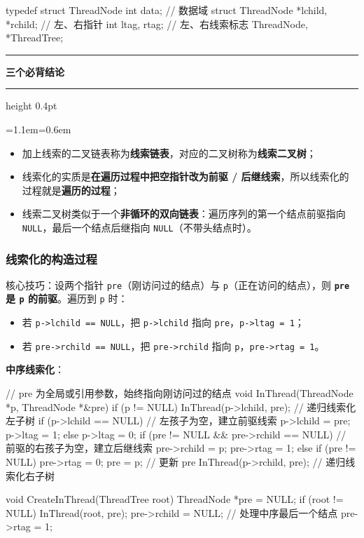 \documentclass[11pt,openany,UTF8]{ctexbook}
\newcommand{\callouthead}[2]{%
  \par\addvspace{7pt}\noindent
  {\color{#1}\rule[-0.15em]{3pt}{1.05em}}\hspace{0.5em}%
  {\bfseries\color{#1}#2}\par\nobreak\vspace{-0.35em}%
  {\color{rulesep}\hrule height 0.4pt}\nobreak\vspace{0.45em}%
  \begingroup\small\setlength{\parindent}{0pt}%
  \leftskip=1.1em\rightskip=0.6em\noindent\ignorespaces}
\newcommand{\calloutend}{\par\endgroup\addvspace{7pt}}
\newenvironment{callkey}[1]{\callouthead{keybar}{#1}}{\calloutend}
\begin{document}
\begin{codebox}
typedef struct ThreadNode {
    int data;                            // 数据域
    struct ThreadNode *lchild, *rchild;  // 左、右指针
    int ltag, rtag;                      // 左、右线索标志
} ThreadNode, *ThreadTree;
\end{codebox}

\begin{callkey}{三个必背结论}
\begin{itemize}
\item 加上线索的二叉链表称为\textbf{线索链表}，对应的二叉树称为\textbf{线索二叉树}；
\item 线索化的实质是\textbf{在遍历过程中把空指针改为前驱 / 后继线索}，所以线索化的过程就是\textbf{遍历的过程}；
\item 线索二叉树类似于一个\textbf{非循环的双向链表}：遍历序列的第一个结点前驱指向 \texttt{NULL}，最后一个结点后继指向 \texttt{NULL}（不带头结点时）。
\end{itemize}
\end{callkey}

\subsubsection{线索化的构造过程}

核心技巧：设两个指针 \texttt{pre}（刚访问过的结点）与 \texttt{p}（正在访问的结点），则 \textbf{\texttt{pre} 是 \texttt{p} 的前驱}。遍历到 \texttt{p} 时：

\begin{itemize}
\item 若 \texttt{p->\allowbreak{}lchild =\allowbreak{}=\allowbreak{} NULL}，把 \texttt{p->\allowbreak{}lchild} 指向 \texttt{pre}，\texttt{p->\allowbreak{}ltag =\allowbreak{} 1}；
\item 若 \texttt{pre->\allowbreak{}rchild =\allowbreak{}=\allowbreak{} NULL}，把 \texttt{pre->\allowbreak{}rchild} 指向 \texttt{p}，\texttt{pre->\allowbreak{}rtag =\allowbreak{} 1}。
\end{itemize}
\textbf{中序线索化}：

\begin{codebox}
// pre 为全局或引用参数，始终指向刚访问过的结点
void InThread(ThreadNode *p, ThreadNode *&pre) {
    if (p != NULL) {
        InThread(p->lchild, pre);            // 递归线索化左子树
        if (p->lchild == NULL) {             // 左孩子为空，建立前驱线索
            p->lchild = pre;
            p->ltag = 1;
        } else {
            p->ltag = 0;
        }
        if (pre != NULL && pre->rchild == NULL) { // 前驱的右孩子为空，建立后继线索
            pre->rchild = p;
            pre->rtag = 1;
        } else if (pre != NULL) {
            pre->rtag = 0;
        }
        pre = p;                             // 更新 pre
        InThread(p->rchild, pre);            // 递归线索化右子树
    }
}

void CreateInThread(ThreadTree root) {
    ThreadNode *pre = NULL;
    if (root != NULL) {
        InThread(root, pre);
        pre->rchild = NULL;                  // 处理中序最后一个结点
        pre->rtag = 1;
    }
}
\end{codebox}
\end{document}

